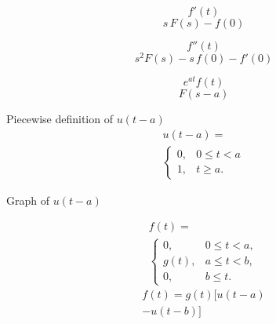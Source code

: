 \documentclass[grid, poker_landscape]{flashcards}
\begin{document}

  \begin{flashcard}{ \[ f'(t) \] }
    \[
      s \, F(s)-f(0)
    \]
  \end{flashcard}

  \begin{flashcard}{ \[ f''(t) \] }
    \[
      s^{2} F(s) -s\,f(0) - f'(0)
    \]
  \end{flashcard}



  \begin{flashcard}{ \[ e^{at} f(t) \] }
    \[
      F(s-a)
    \]
  \end{flashcard}

  \begin{flashcard}{Piecewise definition of $ u(t - a) $}
    \[
        \begin{multlined}
            u(t - a) = \\
            \begin{cases}
                0, & 0 \leq t < a \\
                1, & t \geq a.
            \end{cases}
        \end{multlined}
    \]
  \end{flashcard}

  \begin{flashcard}{Graph of $ u(t - a) $}
  \end{flashcard}

  \begin{flashcard}{
    \[
        \begin{multlined} 
            f(t) = \\
            \begin{cases}
                  0,    & 0 \leq t < a, \\
                  g(t), & a \leq t < b, \\
                  0,    & b \leq t.
            \end{cases}
        \end{multlined}
    \]
    }
    \[
        \begin{multlined}
            f(t) = g(t) \Big [ u(t-a) \\
              - u(t-b) \Big ]
        \end{multlined}
    \]
  \end{flashcard}
\end{document}
